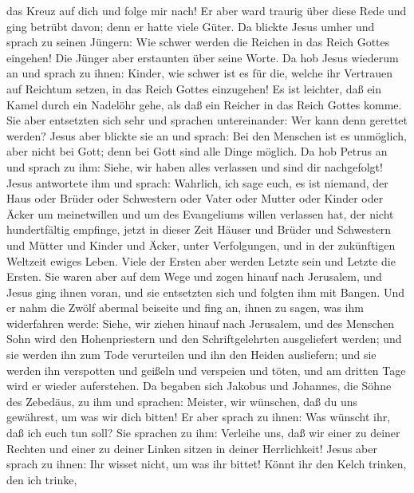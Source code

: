das Kreuz auf dich und folge mir nach!  Er aber ward
traurig über diese Rede und ging betrübt davon; denn er hatte viele
Güter.  Da blickte Jesus umher und sprach zu seinen
Jüngern: Wie schwer werden die Reichen in das Reich Gottes eingehen!
 Die Jünger aber erstaunten über seine Worte. Da hob
Jesus wiederum an und sprach zu ihnen: Kinder, wie schwer ist es für
die, welche ihr Vertrauen auf Reichtum setzen, in das Reich Gottes
einzugehen!  Es ist leichter, daß ein Kamel durch ein
Nadelöhr gehe, als daß ein Reicher in das Reich Gottes komme.
 Sie aber entsetzten sich sehr und sprachen
untereinander: Wer kann denn gerettet werden?  Jesus aber
blickte sie an und sprach: Bei den Menschen ist es unmöglich, aber nicht
bei Gott; denn bei Gott sind alle Dinge möglich.  Da hob
Petrus an und sprach zu ihm: Siehe, wir haben alles verlassen und sind
dir nachgefolgt!  Jesus antwortete ihm und sprach:
Wahrlich, ich sage euch, es ist niemand, der Haus oder Brüder oder
Schwestern oder Vater oder Mutter oder Kinder oder Äcker um meinetwillen
und um des Evangeliums willen verlassen hat,  der nicht
hundertfältig empfinge, jetzt in dieser Zeit Häuser und Brüder und
Schwestern und Mütter und Kinder und Äcker, unter Verfolgungen, und in
der zukünftigen Weltzeit ewiges Leben.  Viele der Ersten
aber werden Letzte sein und Letzte die Ersten.  Sie waren
aber auf dem Wege und zogen hinauf nach Jerusalem, und Jesus ging ihnen
voran, und sie entsetzten sich und folgten ihm mit Bangen. Und er nahm
die Zwölf abermal beiseite und fing an, ihnen zu sagen, was ihm
widerfahren werde:  Siehe, wir ziehen hinauf nach
Jerusalem, und des Menschen Sohn wird den Hohenpriestern und den
Schriftgelehrten ausgeliefert werden; und sie werden ihn zum Tode
verurteilen und ihn den Heiden ausliefern;  und sie
werden ihn verspotten und geißeln und verspeien und töten, und am
dritten Tage wird er wieder auferstehen.  Da begaben sich
Jakobus und Johannes, die Söhne des Zebedäus, zu ihm und sprachen:
Meister, wir wünschen, daß du uns gewährest, um was wir dich bitten!
 Er aber sprach zu ihnen: Was wünscht ihr, daß ich euch
tun soll?  Sie sprachen zu ihm: Verleihe uns, daß wir
einer zu deiner Rechten und einer zu deiner Linken sitzen in deiner
Herrlichkeit!  Jesus aber sprach zu ihnen: Ihr wisset
nicht, um was ihr bittet! Könnt ihr den Kelch trinken, den ich trinke,
